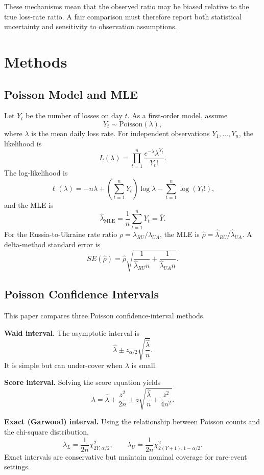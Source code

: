 \documentclass[a4paper,11pt]{article}
\begin{document}
These mechanisms mean that the observed ratio may be biased relative to the true loss-rate ratio. A fair comparison must therefore report both statistical uncertainty and sensitivity to observation assumptions.

\section{Methods}

\subsection{Poisson Model and MLE}

Let $Y_t$ be the number of losses on day $t$. As a first-order model, assume
\[
Y_t \sim \mathrm{Poisson}(\lambda),
\]
where $\lambda$ is the mean daily loss rate. For independent observations $Y_1,\ldots,Y_n$, the likelihood is
\[
L(\lambda)=\prod_{t=1}^{n}\frac{e^{-\lambda}\lambda^{Y_t}}{Y_t!}.
\]
The log-likelihood is
\[
\ell(\lambda)=-n\lambda+\left(\sum_{t=1}^{n}Y_t\right)\log\lambda-\sum_{t=1}^{n}\log(Y_t!),
\]
and the MLE is
\[
\hat{\lambda}_{\mathrm{MLE}}=\frac{1}{n}\sum_{t=1}^{n}Y_t=\bar{Y}.
\]
For the Russia-to-Ukraine rate ratio $\rho=\lambda_{RU}/\lambda_{UA}$, the MLE is $\hat{\rho}=\hat{\lambda}_{RU}/\hat{\lambda}_{UA}$. A delta-method standard error is
\[
SE(\hat{\rho})=\hat{\rho}\sqrt{\frac{1}{\hat{\lambda}_{RU}n}+\frac{1}{\hat{\lambda}_{UA}n}}.
\]

\subsection{Poisson Confidence Intervals}

This paper compares three Poisson confidence-interval methods.

\textbf{Wald interval.} The asymptotic interval is
\[
\hat{\lambda}\pm z_{\alpha/2}\sqrt{\frac{\hat{\lambda}}{n}}.
\]
It is simple but can under-cover when $\lambda$ is small.

\textbf{Score interval.} Solving the score equation yields
\[
\lambda=\hat{\lambda}+\frac{z^2}{2n}\pm z\sqrt{\frac{\hat{\lambda}}{n}+\frac{z^2}{4n^2}}.
\]

\textbf{Exact (Garwood) interval.} Using the relationship between Poisson counts and the chi-square distribution,
\[
\lambda_L=\frac{1}{2n}\chi^2_{2Y,\alpha/2},\qquad
\lambda_U=\frac{1}{2n}\chi^2_{2(Y+1),1-\alpha/2}.
\]
Exact intervals are conservative but maintain nominal coverage for rare-event settings.
\end{document}
